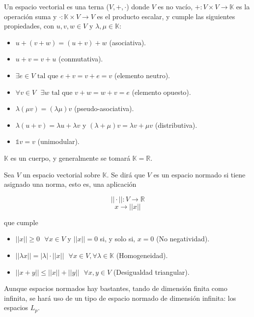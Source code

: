 \begin{definicion}
Un espacio vectorial es una terna ($V,+,\cdot$) donde $V$ es no vacío, $+:V\times V \to \mathbb{K}$ es la operación suma y $\cdot:\mathbb{K}\times V \to V$ es el producto escalar, y cumple las siguientes propiedades, con $u,v,w \in V \text{ y } \lambda,\mu \in \mathbb{K}$:
\begin{itemize}
	\item $u+(v+w)=(u+v)+w$ (asociativa).
	\item $u+v=v+u$ (conmutativa).
	\item $\exists e\in V \text{ tal que } e+v=v+e=v$ (elemento neutro).
	\item $\forall v\in V \text{ } \exists w \text{ tal que } v+w=w+v=e$ (elemento opuesto).
	\item $\lambda(\mu v)=(\lambda\mu)v$ (pseudo-asociativa).
	 \item $\lambda(u+v)=\lambda u+\lambda v$ y $(\lambda+\mu)v=\lambda v+\mu v$ (distributiva).
	\item $\mathbb{1}v=v$ (unimodular).
\end{itemize}

$\mathbb{K}$ es un cuerpo, y generalmente se tomará $\mathbb{K}=\mathbb{R}$.
\end{definicion}

\begin{definicion}
Sea $V$ un espacio vectorial sobre $\mathbb{K}$. Se dirá que $V$ es un espacio normado si tiene asignado una norma, esto es, una aplicación

$$||\cdot||: V \to \mathbb{R}$$
$$x \to ||x||$$

que cumple

\begin{itemize}
    \item $||x|| \geq 0 \text{ } \forall x \in V$ y $||x||=0$ si, y solo si, $x=0$ (No negatividad).
    \item $||\lambda x||=|\lambda|\cdot ||x|| \text{ } \forall x \in V, \forall \lambda \in \mathbb{K}$ (Homogeneidad).
    \item $||x+y|| \leq ||x|| + ||y|| \text{ } \forall x,y \in V$ (Desigualdad triangular).
\end{itemize}
\end{definicion}

Aunque espacios normados hay bastantes, tando de dimensión finita como infinita, se hará uso de un tipo de espacio normado de dimensión infinita: los espacios $L_p$.

